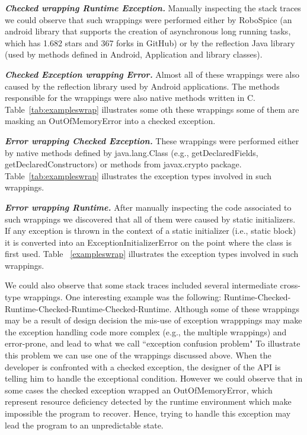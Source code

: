 \documentclass[conference]{IEEEtran}
\begin{document}
\emph{\textbf{Checked wrapping Runtime Exception.}} Manually inspecting the stack 
traces we could observe that such wrappings were performed either 
by RoboSpice (an android library that supports the creation of asynchronous long running 
tasks, which has 1.682 stars and 367 forks in GitHub) or by the reflection Java library (used by
methods defined in Android, Application and library classes). 

\emph{\textbf{Checked Exception wrapping Error.}} Almost all of these wrappings
 were also caused by the reflection library used by Android applications. The methods responsible for the wrappings
were also native methods written in C. Table~\ref{tab:exampleswrap} illustrates
some oth these wrappings some of them are masking an OutOfMemoryError
into a checked exception.

\emph{\textbf{Error wrapping Checked Exception.}} These wrappings were performed
either by native methods defined by java.lang.Class (e.g., getDeclaredFields, getDeclaredConstructors) 
or methods from javax.crypto package. Table~\ref{tab:exampleswrap} illustrates
the exception types involved in such wrappings.

\emph{\textbf{Error wrapping Runtime.}} After manually inspecting the code associated to such wrappings 
we discovered that all of them were caused by static initializers. If any exception is thrown in the context of a static initializer (i.e., static block) 
it is converted into an ExceptionInitializerError on the point where the class is first used. Table ~\ref{exampleswrap} illustrates
the exception types involved in such wrappings.

We could also observe that some stack traces included several intermediate cross-type wrappings.
One interesting example was the following: Runtime-Checked-Runtime-Checked-Runtime-Checked-Runtime.
Although some of these wrappings may be a result of design decision
the mis-use of exception wrapppings may make the exception handling 
code more complex (e.g., the multiple wrappings) and error-prone,
 and lead to what we call ``exception confusion problem"
To illustrate this problem we can use one of the wrappings discussed above.
When the developer is confronted with a checked exception, the designer of the API is telling him 
to handle the exceptional condition. However we could observe that in some cases the 
checked exception wrapped an OutOfMemoryError, which represent resource deficiency detected 
by the runtime environment which make impossible the program to recover. 
Hence, trying to handle this exception may lead the program to an unpredictable state.
\end{document}
